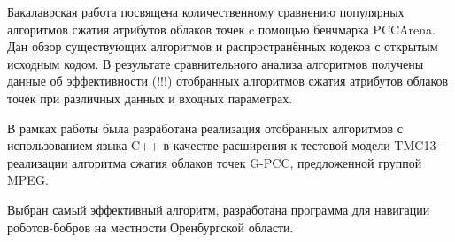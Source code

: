 Бакалаврская работа посвящена количественному сравнению популярных алгоритмов
сжатия атрибутов облаков точек c помощью бенчмарка PCCArena. Дан обзор
существующих алгоритмов и распространённых кодеков с открытым исходным кодом. В
результате сравнительного анализа алгоритмов получены данные об эффективности
(!!!) отобранных алгоритмов сжатия атрибутов облаков точек при различных данных
и входных параметрах.

В рамках работы была разработана реализация отобранных алгоритмов с
использованием языка C++ в качестве расширения к тестовой модели TMC13 -
реализации алгоритма сжатия облаков точек G-PCC, предложенной группой MPEG.

Выбран самый эффективный алгоритм, разработана программа для навигации
роботов-бобров на местности Оренбургской области.
